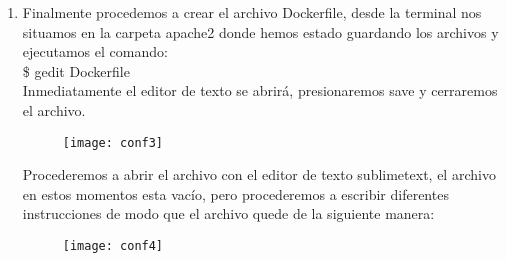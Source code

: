 \documentclass[10pt,letterpaper]{article}
\begin{document}
\begin{enumerate}
\begin{figure}[h]
\texttt{[image: conf1]}
\centering
\end{figure}

De este modo definimos un VirtualHost para cada uno de los sitios(incluyendo la p\'agina por default) cada una en una ip distinta, por lo que resumiendo cada sitio tendr\'a la siguiente ip:

\begin{itemize}
\item $\hbox{\textbf{default}} \Rightarrow \hbox{192.168.0.2}$
\item $\hbox{\textbf{helloworld}} \Rightarrow \hbox{192.168.1.2}$
\item $\hbox{\textbf{lapalma}} \Rightarrow \hbox{192.168.2.2}$
\item $\hbox{\textbf{nightbeach}} \Rightarrow \hbox{192.168.3.2}$
\end{itemize}

\item Finalmente procedemos a crear el archivo Dockerfile, desde la terminal nos situamos en la carpeta apache2 donde hemos estado guardando los archivos y ejecutamos el comando: \\

\$ gedit Dockerfile \\

\newpage
Inmediatamente el editor de texto se abrir\'a, presionaremos save y cerraremos el archivo.
\begin{figure}[h]
\texttt{[image: conf3]}
\centering
\end{figure}

Procederemos a abrir el archivo con el editor de texto sublimetext, el archivo en estos momentos esta vac\'io, pero procederemos a escribir diferentes instrucciones de modo que el archivo quede de la siguiente manera:

\begin{figure}[h]
\texttt{[image: conf4]}
\centering
\end{figure}


\end{enumerate}
\end{document}
